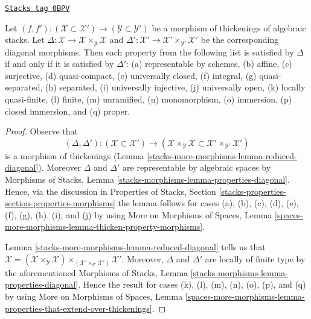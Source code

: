 \begin{lemma}
\label{stacks-more-morphisms-lemma-thickening-diagonals}
\href{https://stacks.math.columbia.edu/tag/0BPV}{\texttt{Stacks tag 0BPV}}

Let $(f, f') : (\mathcal{X} \subset \mathcal{X}') \to
(\mathcal{Y} \subset \mathcal{Y}')$ be a morphism of thickenings
of algebraic stacks.
Let $\Delta : \mathcal{X} \to \mathcal{X} \times_\mathcal{Y} \mathcal{X}$ and
$\Delta' : \mathcal{X}' \to \mathcal{X}' \times_{\mathcal{Y}'} \mathcal{X}'$
be the corresponding diagonal morphisms.
Then each property from the following list is satisfied by $\Delta$ if
and only if it is satisfied by $\Delta'$:
(a) representable by schemes, (b) affine, (c) surjective, (d) quasi-compact,
(e) universally closed, (f) integral, (g) quasi-separated, (h) separated,
(i) universally injective, (j) universally open, (k) locally quasi-finite,
(l) finite, (m) unramified, (n) monomorphism, (o) immersion,
(p) closed immersion, and (q) proper.
\end{lemma}

\begin{proof}
Observe that
$$
(\Delta, \Delta') :
(\mathcal{X} \subset \mathcal{X}')
\longrightarrow
(\mathcal{X} \times_\mathcal{Y} \mathcal{X} \subset
\mathcal{X}' \times_{\mathcal{Y}'} \mathcal{X}')
$$
is a morphism of thickenings (Lemma \ref{stacks-more-morphisms-lemma-reduced-diagonal}).
Moreover $\Delta$ and $\Delta'$ are
representable by algebraic spaces by
Morphisms of Stacks, Lemma \ref{stacks-morphisms-lemma-properties-diagonal}.
Hence, via the discussion in
Properties of Stacks, Section
\ref{stacks-properties-section-properties-morphisms}
the lemma follows for cases (a), (b), (c), (d),
(e), (f), (g), (h), (i), and (j) by using
More on Morphisms of Spaces, Lemma
\ref{spaces-more-morphisms-lemma-thicken-property-morphisms}.

\medskip\noindent
Lemma \ref{stacks-more-morphisms-lemma-reduced-diagonal} tells us that
$\mathcal{X} = (\mathcal{X} \times_\mathcal{Y} \mathcal{X})
\times_{(\mathcal{X}' \times_{\mathcal{Y}'} \mathcal{X}')} \mathcal{X}'$.
Moreover, $\Delta$ and $\Delta'$ are locally of finite type by
the aforementioned
Morphisms of Stacks, Lemma \ref{stacks-morphisms-lemma-properties-diagonal}.
Hence the result for cases (k), (l), (m), (n), (o), (p), and (q) by using
More on Morphisms of Spaces, Lemma
\ref{spaces-more-morphisms-lemma-properties-that-extend-over-thickenings}.
\end{proof}

